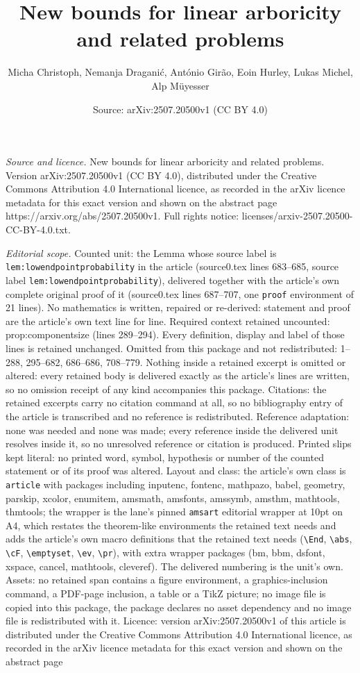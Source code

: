 \documentclass[10pt,a4paper]{amsart}
\title[New bounds for linear arboricity and related problems]{New bounds for linear arboricity and related problems}
\author{Micha Christoph, Nemanja Dragani\'c, Ant\'onio Gir\~ao, Eoin Hurley, Lukas Michel, Alp M\"uyesser}
\date{Source: arXiv:2507.20500v1 (CC BY 4.0)}
\begin{document}
\maketitle

\noindent\emph{Source and licence.} New bounds for linear arboricity and related problems. Version arXiv:2507.20500v1 (CC BY 4.0), distributed under the Creative Commons Attribution 4.0 International licence, as recorded in the arXiv licence metadata for this exact version and shown on the abstract page https://arxiv.org/abs/2507.20500v1. Full rights notice: licenses/arxiv-2507.20500-CC-BY-4.0.txt.\par\smallskip

\noindent\textit{Editorial scope.} Counted unit: the Lemma whose source label is \texttt{lem:lowendpointprobability} in the article (source0.tex lines 683--685, source label \texttt{lem:lowendpointprobability}), delivered together with the article's own complete original proof of it (source0.tex lines 687--707, one \texttt{proof} environment of 21 lines). No mathematics is written, repaired or re-derived: statement and proof are the article's own text line for line. Required context retained uncounted: prop:componentsize (lines 289--294). Every definition, display and label of those lines is retained unchanged. Omitted from this package and not redistributed: 1--288, 295--682, 686--686, 708--779. Nothing inside a retained excerpt is omitted or altered: every retained body is delivered exactly as the article's lines are written, so no omission receipt of any kind accompanies this package. Citations: the retained excerpts carry no citation command at all, so no bibliography entry of the article is transcribed and no reference is redistributed. Reference adaptation: none was needed and none was made; every reference inside the delivered unit resolves inside it, so no unresolved reference or citation is produced. Printed slips kept literal: no printed word, symbol, hypothesis or number of the counted statement or of its proof was altered. Layout and class: the article's own class is \texttt{article} with packages including inputenc, fontenc, mathpazo, babel, geometry, parskip, xcolor, enumitem, amsmath, amsfonts, amssymb, amsthm, mathtools, thmtools; the wrapper is the lane's pinned \texttt{amsart} editorial wrapper at 10pt on A4, which restates the theorem-like environments the retained text needs and adds the article's own macro definitions that the retained text needs (\texttt{\textbackslash End}, \texttt{\textbackslash abs}, \texttt{\textbackslash cF}, \texttt{\textbackslash emptyset}, \texttt{\textbackslash ev}, \texttt{\textbackslash pr}), with extra wrapper packages (bm, bbm, dsfont, xspace, cancel, mathtools, cleveref). The delivered numbering is the unit's own. Assets: no retained span contains a figure environment, a graphics-inclusion command, a PDF-page inclusion, a table or a TikZ picture; no image file is copied into this package, the package declares no asset dependency and no image file is redistributed with it. Licence: version arXiv:2507.20500v1 of this article is distributed under the Creative Commons Attribution 4.0 International licence, as recorded in the arXiv licence metadata for this exact version and shown on the abstract page 
\end{document}
